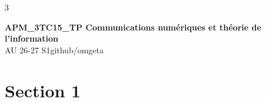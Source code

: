 \documentclass[12pt, a4paper]{article}
\newcommand{\mytitle}{APM\_3TC15\_TP Communications numériques et théorie de l'information}
\newcommand{\myauthor}{github/omgeta}
\newcommand{\mydate}{AU 26-27 S1}
\begin{document}
\raggedright
\footnotesize
\begin{multicols*}{3}
\setlength{\premulticols}{1pt}
\setlength{\postmulticols}{1pt}
\setlength{\multicolsep}{1pt}
\setlength{\columnsep}{2pt}

{\normalsize{\textbf{\mytitle}}}\\
{\footnotesize{\mydate\hspace{2pt}\textemdash\hspace{2pt}\myauthor}}
\section{Section 1}
\end{multicols*}
\end{document}
